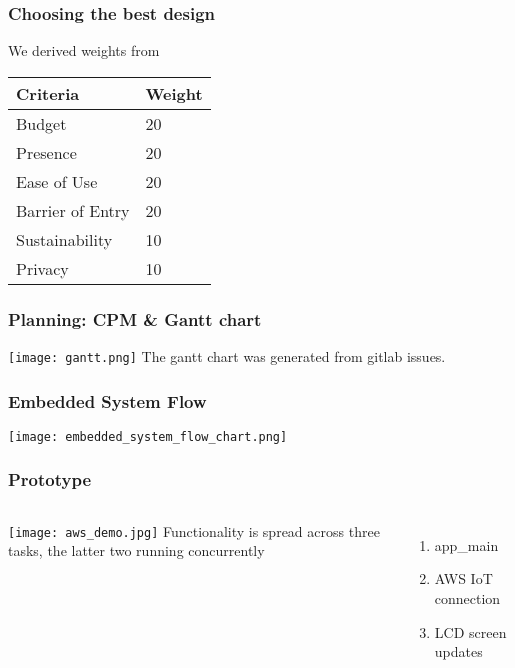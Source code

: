 \documentclass{beamer}
\begin{document}
\begin{frame}
  \frametitle{Choosing the best design}
  We derived weights from
  \begin{longtable}[]{@{}ll@{}}
  \toprule
  Criteria & Weight \\
  \midrule
  \endhead
  Budget & 20 \\
  Presence & 20 \\
  Ease of Use & 20 \\
  Barrier of Entry & 20 \\
  Sustainability & 10 \\
  Privacy & 10 \\
  \bottomrule
  \end{longtable}

\end{frame}

\begin{frame}
  \frametitle{Planning: CPM \& Gantt chart}
  \texttt{[image: gantt.png]}
  The gantt chart was generated from gitlab issues.

\end{frame}

\begin{frame}
  \frametitle{Embedded System Flow}
  \texttt{[image: embedded\_system\_flow\_chart.png]}
\end{frame}

\begin{frame}
  \frametitle{Prototype}
  \begin{columns}
    \texttt{[image: aws\_demo.jpg]}
    Functionality is spread across three tasks, the latter two running concurrently
    \begin{enumerate}
      \item app\_main
      \item AWS IoT connection
      \item LCD screen updates
    \end{enumerate}
  \end{columns}

\end{frame}
\end{document}
